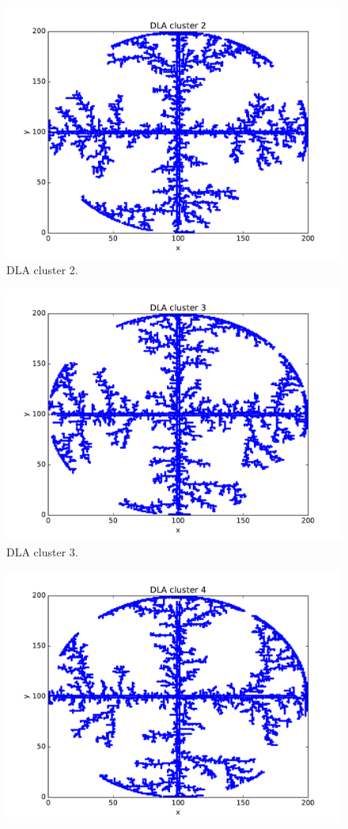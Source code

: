 \documentclass[aps,prl,preprint,superscriptaddress]{revtex4}
\begin{document}
\begin{enumerate}
\begin{figure}[H]
			\includegraphics[width=1.0\textwidth]{dla_1.pdf}
			\caption{DLA cluster 2.}
		\end{figure}
				\begin{figure}[H]
			\centering
			\includegraphics[width=1.0\textwidth]{dla_2.pdf}
			\caption{DLA cluster 3.}
		\end{figure}
				\begin{figure}[H]
			\centering
			\includegraphics[width=1.0\textwidth]{dla_3.pdf}

\end{figure}
\end{enumerate}
\end{document}
